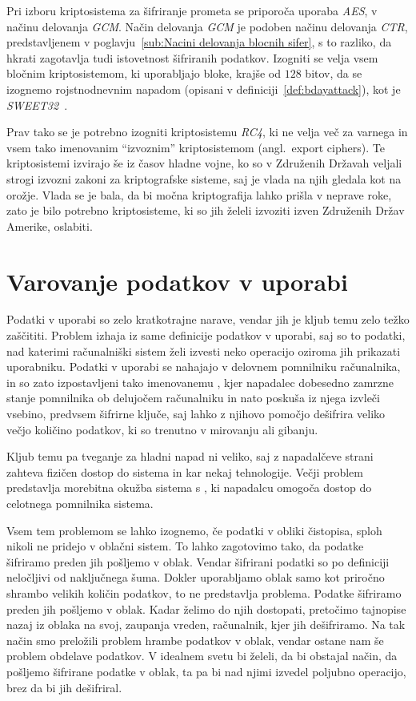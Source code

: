 \documentclass[12pt,a4paper,openany,tikz]{book}
\theoremstyle{plain}
\theoremstyle{definition}
\begin{document}
Pri izboru kriptosistema za šifriranje prometa se priporoča uporaba \textit{AES}, v načinu delovanja \textit{GCM}. Način delovanja \textit{GCM} je podoben načinu delovanja \textit{CTR}, predstavljenem v poglavju~\ref{sub:Nacini delovanja blocnih sifer}, s to razliko, da hkrati zagotavlja tudi istovetnost šifriranih podatkov. Izogniti se velja vsem bločnim kriptosistemom, ki uporabljajo bloke, krajše od $128$ bitov, da se izognemo rojstnodnevnim napadom (opisani v definiciji~\ref{def:bdayattack}), kot je \textit{SWEET32}~\cite{sweet32}.

Prav tako se je potrebno izogniti kriptosistemu \textit{RC4}, ki ne velja več za varnega in vsem tako imenovanim ``izvoznim'' kriptosistemom (angl.\ export ciphers). Te kriptosistemi izvirajo še iz časov hladne vojne, ko so v Združenih Državah veljali strogi izvozni zakoni za kriptografske sisteme, saj je vlada na njih gledala kot na orožje. Vlada se je bala, da bi močna kriptografija lahko prišla v neprave roke, zato je bilo potrebno kriptosisteme, ki so jih želeli izvoziti izven Združenih Držav Amerike, oslabiti.


\section{Varovanje podatkov v uporabi}
\label{sec:Varovanje podatkov v uporabi}

Podatki v uporabi so zelo kratkotrajne narave, vendar jih je kljub temu zelo težko zaščititi. Problem izhaja iz same definicije podatkov v uporabi, saj so to podatki, nad katerimi računalniški sistem želi izvesti neko operacijo oziroma jih prikazati uporabniku. Podatki v uporabi se nahajajo v delovnem pomnilniku računalnika, in so zato izpostavljeni tako imenovanemu , kjer napadalec dobesedno zamrzne stanje pomnilnika ob delujočem računalniku in nato poskuša iz njega izvleči vsebino, predvsem šifrirne ključe, saj lahko z njihovo pomočjo dešifrira veliko večjo količino podatkov, ki so trenutno v mirovanju ali gibanju.

Kljub temu pa tveganje za hladni napad ni veliko, saj z napadalčeve strani zahteva fizičen dostop do sistema in kar nekaj tehnologije. Večji problem predstavlja morebitna okužba sistema s , ki napadalcu omogoča dostop do celotnega pomnilnika sistema.

Vsem tem problemom se lahko izognemo, če podatki v obliki čistopisa, sploh nikoli ne pridejo v oblačni sistem. To lahko zagotovimo tako, da podatke šifriramo preden jih pošljemo v oblak. Vendar šifrirani podatki so po definiciji neločljivi od naključnega šuma. Dokler uporabljamo oblak samo kot priročno shrambo velikih količin podatkov, to ne predstavlja problema. Podatke šifriramo preden jih pošljemo v oblak. Kadar želimo do njih dostopati, pretočimo tajnopise nazaj iz oblaka na svoj, zaupanja vreden, računalnik, kjer jih dešifriramo. Na tak način smo preložili problem hrambe podatkov v oblak, vendar ostane nam še problem obdelave podatkov. V idealnem svetu bi želeli, da bi obstajal način, da pošljemo šifrirane podatke v oblak, ta pa bi nad njimi izvedel poljubno operacijo, brez da bi jih dešifriral.
\end{document}
